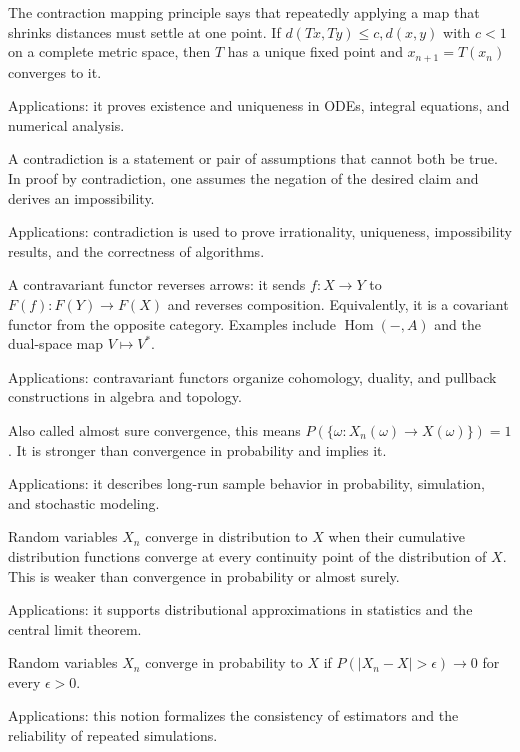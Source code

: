 The contraction mapping principle says that repeatedly applying a map that shrinks distances must settle at one point. If $d(Tx,Ty)\le c,d(x,y)$ with $c<1$ on a complete metric space, then $T$ has a unique fixed point and $x_{n+1}=T(x_n)$ converges to it. \par\noindent Applications: it proves existence and uniqueness in ODEs, integral equations, and numerical analysis.

A contradiction is a statement or pair of assumptions that cannot both be true. In proof by contradiction, one assumes the negation of the desired claim and derives an impossibility. \par\noindent Applications: contradiction is used to prove irrationality, uniqueness, impossibility results, and the correctness of algorithms.

A contravariant functor reverses arrows: it sends $f:X\to Y$ to $F(f):F(Y)\to F(X)$ and reverses composition. Equivalently, it is a covariant functor from the opposite category. Examples include $\operatorname{Hom}(-,A)$ and the dual-space map $V\mapsto V^*$. \par\noindent Applications: contravariant functors organize cohomology, duality, and pullback constructions in algebra and topology.

Also called almost sure convergence, this means $P(\{\omega:X_n(\omega)\to X(\omega)\})=1$. It is stronger than convergence in probability and implies it. \par\noindent Applications: it describes long-run sample behavior in probability, simulation, and stochastic modeling.

Random variables $X_n$ converge in distribution to $X$ when their cumulative distribution functions converge at every continuity point of the distribution of $X$. This is weaker than convergence in probability or almost surely. \par\noindent Applications: it supports distributional approximations in statistics and the central limit theorem.

Random variables $X_n$ converge in probability to $X$ if $P(|X_n-X|>\epsilon)\to0$ for every $\epsilon>0$. \par\noindent Applications: this notion formalizes the consistency of estimators and the reliability of repeated simulations.


